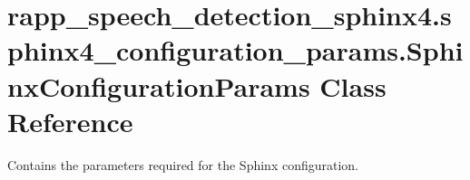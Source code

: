 \hypertarget{classrapp__speech__detection__sphinx4_1_1sphinx4__configuration__params_1_1SphinxConfigurationParams}{\section{rapp\-\_\-speech\-\_\-detection\-\_\-sphinx4.\-sphinx4\-\_\-configuration\-\_\-params.\-Sphinx\-Configuration\-Params Class Reference}
\label{classrapp__speech__detection__sphinx4_1_1sphinx4__configuration__params_1_1SphinxConfigurationParams}
}


Contains the parameters required for the Sphinx configuration.  


